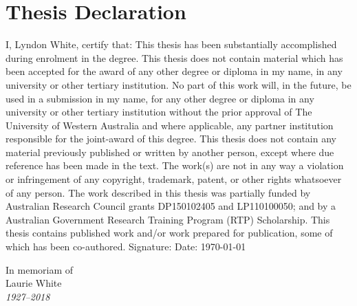 \documentclass{book}
\begin{document}
\section*{Thesis Declaration}
\vskip 0.8cm
\begin{flushleft}
	I, Lyndon White, certify that:
	\vskip 0.5cm 
	This thesis has been substantially accomplished during enrolment in the degree.
	\vskip 0.25cm
	This thesis does not contain material which has been accepted for the award of any other degree or diploma in my name, in any university or other tertiary institution.
	\vskip 0.25cm
	No part of this work will, in the future, be used in a submission in my name, for any other degree or diploma in any university or other tertiary institution without the prior approval of The University of Western Australia and where applicable, any partner institution responsible for the joint-award of this degree.
	\vskip 0.25cm
	This thesis does not contain any material previously published or written by another person, except where due reference has been made in the text. 
	\vskip 0.25cm
	The work(s) are not in any way a violation or infringement of any copyright, trademark, patent, or other rights whatsoever of any person.
	\vskip 0.25cm
	The work described in this thesis was partially funded by 
	Australian Research Council grants DP150102405 and LP110100050;
	and by a Australian Government Research Training Program (RTP) Scholarship.
	\vskip 0.25cm
	This thesis contains published work and/or work prepared for publication, some of which has been co-authored. 
	\vskip 0.5cm
	Signature: 
	\vskip 0.25cm
	Date: \today
\end{flushleft}




{%
	\clearpage
	\thispagestyle{empty}
	\centering
	{
		In memoriam of\\
		Laurie White\\
		\emph{1927--2018}\\
	}
	\clearpage
}



\end{document}
